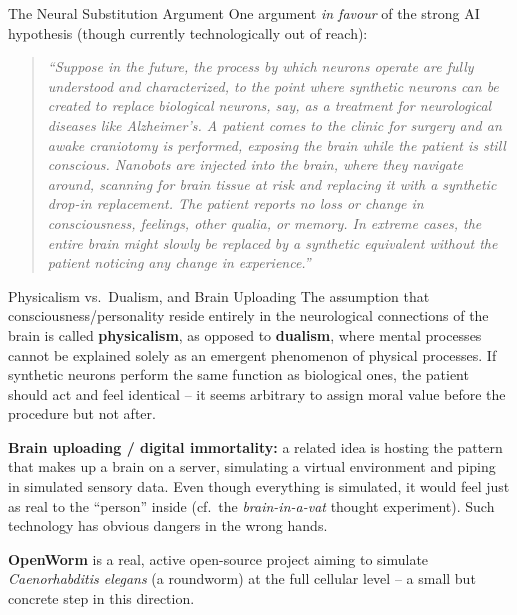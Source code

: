 \documentclass[aspectratio=169,10pt]{beamer}
\begin{document}
\begin{frame}{The Neural Substitution Argument}
  One argument \emph{in favour} of the strong AI hypothesis (though
  currently technologically out of reach):

  \begin{quote}
    \small\itshape ``Suppose in the future, the process by which neurons
    operate are fully understood and characterized, to the point where
    synthetic neurons can be created to replace biological neurons, say, as
    a treatment for neurological diseases like Alzheimer's. A patient comes
    to the clinic for surgery and an awake craniotomy is performed, exposing
    the brain while the patient is still conscious. Nanobots are injected
    into the brain, where they navigate around, scanning for brain tissue at
    risk and replacing it with a synthetic drop-in replacement. The patient
    reports no loss or change in consciousness, feelings, other qualia, or
    memory. In extreme cases, the entire brain might slowly be replaced by a
    synthetic equivalent without the patient noticing any change in
    experience.''
  \end{quote}
\end{frame}

\begin{frame}{Physicalism vs.\ Dualism, and Brain Uploading}
  The assumption that consciousness/personality reside entirely in the
  neurological connections of the brain is called \textbf{physicalism}, as
  opposed to \textbf{dualism}, where mental processes cannot be explained
  solely as an emergent phenomenon of physical processes. If synthetic
  neurons perform the same function as biological ones, the patient should
  act and feel identical -- it seems arbitrary to assign moral value before
  the procedure but not after.

  \vspace{0.4em}
  \textbf{Brain uploading / digital immortality:} a related idea is hosting
  the pattern that makes up a brain on a server, simulating a virtual
  environment and piping in simulated sensory data. Even though everything
  is simulated, it would feel just as real to the ``person'' inside (cf.\
  the \emph{brain-in-a-vat} thought experiment). Such technology has
  obvious dangers in the wrong hands.

  \vspace{0.4em}
  \textbf{OpenWorm} is a real, active open-source project aiming to
  simulate \emph{Caenorhabditis elegans} (a roundworm) at the full cellular
  level -- a small but concrete step in this direction.
\end{frame}
\end{document}
